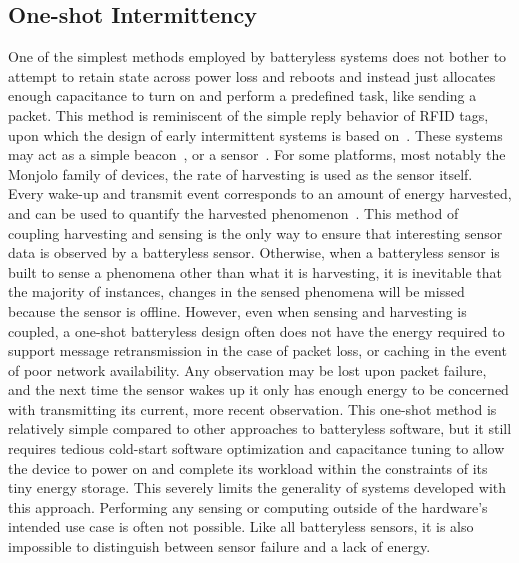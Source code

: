 \subsection{One-shot Intermittency}
One of the simplest methods employed by batteryless systems does not bother to attempt to retain state across power loss and reboots
and instead just allocates enough capacitance to turn on and perform a predefined task, like sending a packet.
This method is reminiscent of the simple reply behavior of RFID tags, upon which the design of early intermittent systems is based on~\cite{sample2008design}.
These systems may act as a simple beacon~\cite{campbell2016cinamin,saoda2019no}, or a sensor~\cite{yervaGrafting12, debruin2013monjolo, campbellEnergy14, campbellThermes14}.
For some platforms, most notably the Monjolo family of devices, the rate of harvesting is used as the sensor itself. Every wake-up and transmit event corresponds to an amount of energy harvested, and can be used to quantify the harvested phenomenon~\cite{campbellThermes14, campbellEnergy14, debruin2013monjolo}.
This method of coupling harvesting and sensing is the only way to ensure that interesting sensor data is observed by a batteryless sensor.
Otherwise, when a batteryless sensor is built to sense a phenomena other than what it is harvesting, it is inevitable that the majority of instances, changes in the sensed phenomena will be missed because the sensor is offline.
However, even when sensing and harvesting is coupled, a one-shot batteryless design often does not have the energy required to support message retransmission in the case of packet loss, or caching in the event of poor network availability. Any observation may be lost upon packet failure, and the next time the sensor wakes up it only has enough energy to be concerned with transmitting its current, more recent observation.
This one-shot method is relatively simple compared to other approaches to batteryless software, but it still requires tedious cold-start software optimization and capacitance tuning to allow the device to power on and complete its workload within the constraints of its tiny energy storage.
This severely limits the generality of systems developed with this approach.
Performing any sensing or computing outside of the hardware's intended use case is often not possible.
Like all batteryless sensors, it is also impossible to distinguish between sensor failure and a lack of energy.

